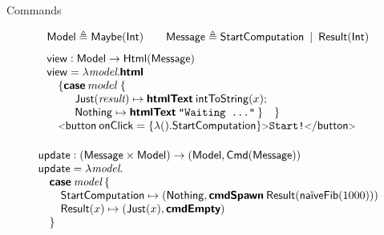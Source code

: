 \documentclass[11.5pt, aspectratio=169]{beamer}
\begin{document}

\begin{frame}{Commands}

  {\small
  \[
\bl
\mkwd{Model} \defeq \mkwd{Maybe}(\intty) \qquad
\mkwd{Message} \defeq \mkwd{StartComputation} \midspace \mkwd{Result}(\intty) \vspace{0.75em} \\
%
%
\mkwd{view} : \mkwd{Model} \to \htmlty{\mkwd{Message}} \\
\mkwd{view} = \lambda \var{model} . \calcwd{html} \\
\quad \{
  \caseofone{model} \{ \\
  \qquad
  {\begin{array}[t]{l}
     \mkwd{Just}(\textit{result}) \mapsto \htmltext{\intstr{x}}; \\
     \mkwd{Nothing} \mapsto \htmltext{\textnode{"Waiting \ldots"}} \:
   \}
  \quad \} \\
  \end{array}} \\
  \quad \htmltag{button}{\attribute{onClick} = \antiquote{\lambda () .
  \mkwd{StartComputation}} }{\textnode{Start!}} \vspace{0.75em} \\
\el
\]%
\[
  \begin{array}{l}
\mathsf{update} : (\mathsf{Message} \times \mathsf{Model}) \to (\mathsf{Model},
\mathsf{Cmd}(\mathsf{Message}))\\
\mathsf{update} = \lambda \textit{model} . \\
\quad \textbf{\textsf{case}} \: \textit{model} \: \{ \\
  \qquad \mathsf{StartComputation} \mapsto (\mathsf{Nothing},
  \textbf{\textsf{cmdSpawn}} \: \mathsf{Result}(\textsf{na\"iveFib}(1000))) \\
  \qquad \mathsf{Result}(x) \mapsto (\mathsf{Just}(x), \textbf{\textsf{cmdEmpty}}) \\
  \quad \}
\end{array}
\]%
}
\end{frame}
\end{document}
